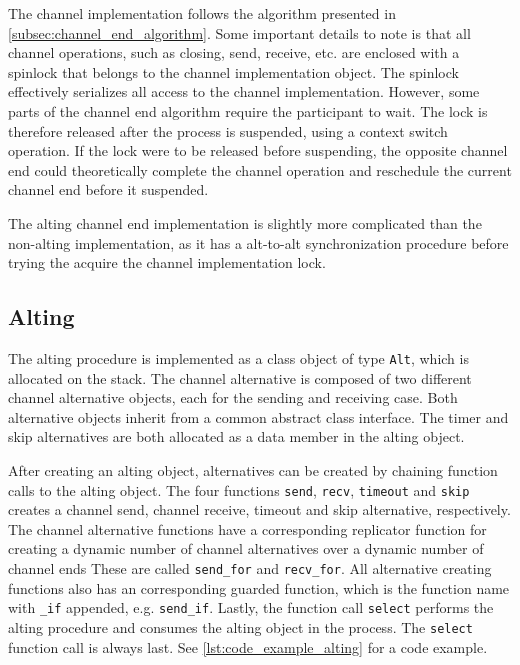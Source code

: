 The channel implementation follows the algorithm presented in \cref{subsec:channel_end_algorithm}. Some important details to note is that all channel operations, such as closing, send, receive, etc. are enclosed with a spinlock that belongs to the channel implementation object. The spinlock effectively serializes all access to the channel implementation. However, some parts of the channel end algorithm require the participant to wait. The lock is therefore released after the process is suspended, using a context switch operation. If the lock were to be released before suspending, the opposite channel end could theoretically complete the channel operation and reschedule the current channel end before it suspended.

The alting channel end implementation is slightly more complicated than the non\hyp{}alting implementation, as it has a alt\hyp{}to\hyp{}alt synchronization procedure before trying the acquire the channel implementation lock.


\subsection{Alting}


The alting procedure is implemented as a class object of type \lstinline[style={CustomC++}]|Alt|, which is allocated on the stack. The channel alternative is composed of two different channel alternative objects, each for the sending and receiving case. Both alternative objects inherit from a common abstract class interface. The timer and skip alternatives are both allocated as a data member in the alting object. 

After creating an alting object, alternatives can be created by chaining function calls to the alting object. The four functions \texttt{send}, \texttt{recv}, \texttt{timeout} and \texttt{skip} creates a channel send, channel receive, timeout and skip alternative, respectively. The channel alternative functions have a corresponding replicator function for creating a dynamic number of channel alternatives over a dynamic number of channel ends These are called \texttt{send\_for} and \texttt{recv\_for}. All alternative creating functions also has an corresponding guarded function, which is the function name with \texttt{\_if} appended, e.g. \texttt{send\_if}. Lastly, the function call \texttt{select} performs the alting procedure and consumes the alting object in the process. The \texttt{select} function call is always last. See \cref{lst:code_example_alting} for a code example.


